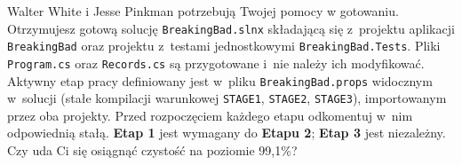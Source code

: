 \documentclass[11pt,a4paper,addpoints]{exam}
\begin{document}
\sloppy

\cellwidth{2.75cm}
\noindent \gradetable[h]

\vspace{0.4cm}

\noindent Walter White i Jesse Pinkman potrzebują Twojej pomocy w gotowaniu. Otrzymujesz gotową solucję \texttt{BreakingBad.slnx} składającą się z~projektu aplikacji \texttt{BreakingBad} oraz projektu z~testami jednostkowymi \texttt{BreakingBad.Tests}. Pliki \texttt{Program.cs} oraz \texttt{Records.cs} są przygotowane i~nie należy ich modyfikować. Aktywny etap pracy definiowany jest w~pliku \texttt{BreakingBad.props} widocznym w~solucji (stałe kompilacji warunkowej \texttt{STAGE1}, \texttt{STAGE2}, \texttt{STAGE3}), importowanym przez oba projekty. Przed rozpoczęciem każdego etapu odkomentuj w~nim odpowiednią stałą. \textbf{Etap 1} jest wymagany do \textbf{Etapu 2}; \textbf{Etap 3} jest niezależny. Czy uda Ci się osiągnąć czystość na poziomie 99,1\%?
\end{document}
